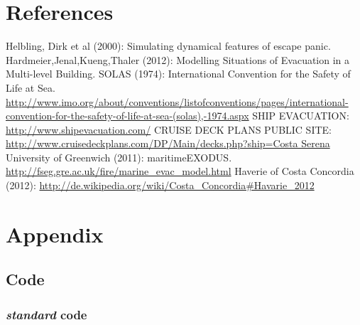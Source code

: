 \documentclass[11pt]{article}
\begin{document}
\section{References}

\begin{thebibliography}{9}
 Helbling, Dirk et al (2000): Simulating dynamical features of escape panic.
 Hardmeier,Jenal,Kueng,Thaler (2012): Modelling Situations of Evacuation in a Multi-level Building.
 SOLAS (1974): International Convention for the Safety of Life at Sea. \url{http://www.imo.org/about/conventions/listofconventions/pages/international-convention-for-the-safety-of-life-at-sea-(solas),-1974.aspx}
 SHIP EVACUATION: \url{http://www.shipevacuation.com/}
 CRUISE DECK PLANS PUBLIC SITE: \url{http://www.cruisedeckplans.com/DP/Main/decks.php?ship=Costa Serena}
 University of Greenwich (2011):  maritimeEXODUS. \url{http://fseg.gre.ac.uk/fire/marine_evac_model.html}
 Haverie of Costa Concordia (2012): \url{http://de.wikipedia.org/wiki/Costa_Concordia#Havarie_2012}
	
\end{thebibliography}
\section{Appendix}

\subsection{Code}



\subsubsection{\textit{standard} code}
\end{document}

